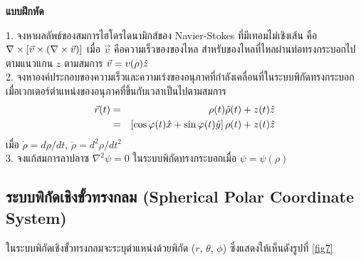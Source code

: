 \begin{center}
\Large{\textbf{แบบฝึกหัด}}\\
\end{center}
1. จงหาผลลัพธ์ของสมการไฮโดรไดนามิกส์ของ Navier-Stokes ที่มีเทอมไม่เชิงเส้น คือ $\nabla\times\left[\vec{v}\times(\nabla\times\vec{v})\right]$ เมื่อ $\vec{v}$ คือความเร็วของของไหล สำหรับของไหลที่ไหลผ่านท่อทรงกระบอกไปตามแนวแกน $z$ ตามสมการ $\vec{v} = v(\rho)\hat{z}$\\
2. จงหาองค์ประกอบของความเร็วและความเร่งของอนุภาคที่กำลังเคลื่อนที่ในระบบพิกัดทรงกระบอก เมื่อเวกเตอร์ตำแหน่งของอนุภาคที่ขึ้นกับเวลาเป็นไปตามสมการ
\begin{eqnarray}\label{CylinderProblem2}
\vec{r}(t) &=& \rho(t)\hat{\rho}(t) + z(t)\hat{z} \nonumber \\
        &=& \left[\cos \varphi(t)\hat{x} + \sin \varphi(t)\hat{y}\right]\rho(t) + z(t)\hat{z} \nonumber
\end{eqnarray}
เมื่อ $\dot{\rho} = d\rho/dt$, $\ddot{\rho} = d^2\rho/dt^2$\\
3. จงแก้สมการลาปลาซ $\nabla^2\psi = 0$ ในระบบพิกัดทรงกระบอกเมื่อ $\psi = \psi(\rho)$

\subsection{ระบบพิกัดเชิงขั้วทรงกลม (Spherical Polar Coordinate System)}

ในระบบพิกัดเชิงขั้วทรงกลมจะระบุตำแหน่งด้วยพิกัด ($r$, $\theta$, $\phi$) ซึ่งแสดงให้เห็นดังรูปที่ \ref{fig7}

